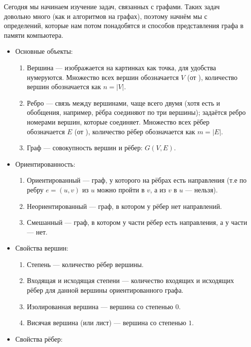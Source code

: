 Сегодня мы начинаем изучение задач, связанных с графами. Таких задач довольно много (как и алгоритмов на графах), поэтому начнём мы с определений, которые нам потом понадобятся и способов представления графа в памяти компьютера.


\begin{itemize}
    \item Основные объекты:
    \begin{enumerate}
        \item Вершина — изображается на картинках как точка, для удобства нумеруются. Множество всех вершин обозначается $V$ (от ), количество вершин обозначается как $n = |V|$.
        \item Ребро — связь между вершинами, чаще всего двумя (хотя есть и обобщения, например, рёбра соединяют по три вершины); задаётся ребро номерами вершин, которые соединяет. Множество всех рёбер обозначается $E$ (от ), количество рёбер обозначается как $m = |E|$.
        \item Граф — совокупность вершин и рёбер: $G(V, E)$.
    \end{enumerate}
    \item Ориентированность:
    \begin{enumerate}
        \item Ориентированный — граф, у которого на рёбрах есть направления (т.е по ребру $e = (u, v)$ из $u$ можно пройти в $v$, а из $v$ в $u$ — нельзя).
        \item Неориентированный — граф, в котором у рёбер нет направлений.
        \item Смешанный — граф, в котором у части рёбер есть направления, а у части — нет.
    \end{enumerate}
    \item Свойства вершин:
    \begin{enumerate}
        \item Степень — количество рёбер вершины.
        \item Входящая и исходящая степени — количество входящих и исходящих рёбер для данной вершины ориентированного графа.
        \item Изолированная вершина — вершина со степенью $0$.
        \item Висячая вершина (или лист) — вершина со степенью $1$.
    \end{enumerate}
    \item Свойства рёбер:
    \begin{enumerate}

\end{enumerate}
\end{itemize}
